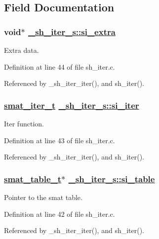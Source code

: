 \subsection{Field Documentation}
\hypertarget{struct__sh__iter__s_o2}{
\subsubsection[si\_\-extra]{\setlength{\rightskip}{0pt plus 5cm}void$\ast$ \hyperlink{struct__sh__iter__s_o2}{\_\-sh\_\-iter\_\-s::si\_\-extra}}}
\label{struct__sh__iter__s_o2}


Extra data. 

Definition at line 44 of file sh\_\-iter.c.

Referenced by \_\-sh\_\-iter\_\-iter(), and sh\_\-iter().\hypertarget{struct__sh__iter__s_o1}{
\subsubsection[si\_\-iter]{\setlength{\rightskip}{0pt plus 5cm}\hyperlink{group__dbprim__smat_ga4}{smat\_\-iter\_\-t} \hyperlink{struct__sh__iter__s_o1}{\_\-sh\_\-iter\_\-s::si\_\-iter}}}
\label{struct__sh__iter__s_o1}


Iter function. 

Definition at line 43 of file sh\_\-iter.c.

Referenced by \_\-sh\_\-iter\_\-iter(), and sh\_\-iter().\hypertarget{struct__sh__iter__s_o0}{
\subsubsection[si\_\-table]{\setlength{\rightskip}{0pt plus 5cm}\hyperlink{struct__smat__table__s}{smat\_\-table\_\-t}$\ast$ \hyperlink{struct__sh__iter__s_o0}{\_\-sh\_\-iter\_\-s::si\_\-table}}}
\label{struct__sh__iter__s_o0}


Pointer to the smat table. 

Definition at line 42 of file sh\_\-iter.c.

Referenced by \_\-sh\_\-iter\_\-iter(), and sh\_\-iter().